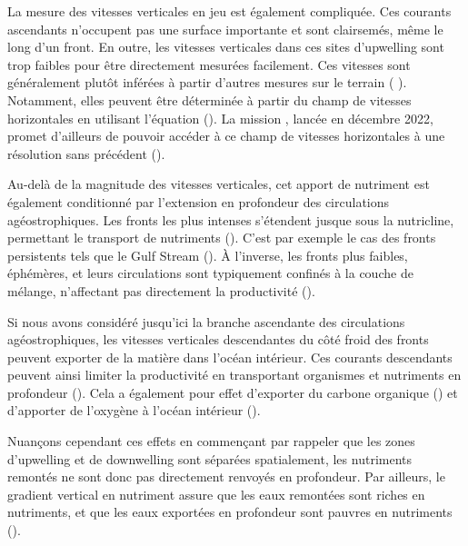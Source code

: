 La mesure des vitesses verticales en jeu est également compliquée.
Ces courants ascendants n'occupent pas une surface importante et sont clairsemés, même le long d'un front.
En outre, les vitesses verticales dans ces sites d'upwelling sont  trop faibles pour être directement mesurées facilement.
Ces vitesses sont généralement plutôt inférées à partir d'autres mesures sur le terrain ( \cite{dasaro_2018,tarry_2021,comby_2022,cutolo_2022}).
Notamment, elles peuvent être déterminée à partir du champ de vitesses horizontales en utilisant l'équation  (\cite{hoskins_1978,pietri_2021}).
La mission , lancée en décembre 2022, promet d'ailleurs de pouvoir accéder à ce champ de vitesses horizontales à une résolution sans précédent (\cite{dovidio_2019,morrow_2019,barcelo-llull_2021}).

Au-delà de la magnitude des vitesses verticales, cet apport de nutriment est également conditionné par l'extension en profondeur des circulations agéostrophiques.
Les fronts les plus intenses s'étendent jusque sous la nutricline, permettant le transport de nutriments (\cite{levy_2001,thomas_2013,pasquerondefommervault_2015,capet_2016}).
C'est par exemple le cas des fronts persistents tels que le Gulf Stream (\cite{levy_2012a}).
À l'inverse, les fronts plus faibles, éphémères, et leurs circulations sont typiquement confinés à la couche de mélange, n'affectant pas directement la productivité (\cite{ramachandran_2014,levy_2018}).

Si nous avons considéré jusqu'ici la branche ascendante des circulations agéostrophiques, les vitesses verticales descendantes du côté froid des fronts peuvent exporter de la matière dans l'océan intérieur.
Ces courants descendants peuvent ainsi limiter la productivité en transportant organismes et nutriments en profondeur (\cite{mcgillicuddy_2003,lathuiliere_2010,gruber_2011,levy_2012a,resplandy_2019}).
Cela a également pour effet d'exporter du carbone organique (\cite{levy_2001,omand_2015}) et d'apporter de l'oxygène à l'océan intérieur (\cite{resplandy_2012}).

Nuançons cependant ces effets en commençant par rappeler que les zones d'upwelling et de downwelling sont séparées spatialement, les nutriments remontés ne sont donc pas directement renvoyés en profondeur.
Par ailleurs, le gradient vertical en nutriment  assure que les eaux remontées sont riches en nutriments, et que les eaux exportées en profondeur sont pauvres en nutriments (\cite{mahadevan_2016}).

